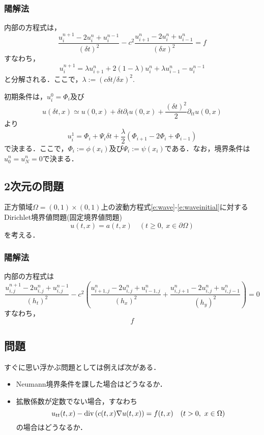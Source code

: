 \subsubsection{陽解法}
内部の方程式は，
$$
\frac{u^{n+1}_{i}-2u^{n}_{i}+u^{n-1}_{i}}{(\delta t)^{2}}-c^{2}\frac{u^{n}_{i+1}-2u^{n}_{i}+u^{n}_{i-1}}{(\delta x)^{2}}=f
$$
すなわち，
$$
u^{n+1}_{i}=\lambda u^{n}_{i+1}+2(1-\lambda)u^{n}_{i}+\lambda u^{n}_{i-1}-u^{n-1}_{i}
$$
と分解される．ここで，$\lambda:=(c\delta t/\delta x)^{2}$.

初期条件は，$u^{0}_{i}=\Phi_{i}$及び
$$
u(\delta t,x)\simeq u(0,x)+\delta t\partial_{t}u(0,x)+\frac{(\delta t)^{2}}{2}\partial_{tt}u(0,x)
$$
より
$$
u^{1}_{i}=\Phi_{i}+\Psi_{i}\delta t+\frac{\lambda}{2}(\Phi_{i+1}-2\Phi_{i}+\Phi_{i-1})
$$
で決まる．ここで，$\Phi_{i}:=\phi(x_i)$及び$\Psi_{i}:=\psi(x_i)$である．なお，境界条件は$u^{n}_{0}=u^{n}_{N}=0$で決まる．

\subsection{2次元の問題}
正方領域$\Omega=(0,1)\times(0,1)$上の波動方程式\eqref{e:wave}-\eqref{e:waveinitial}に対するDirichlet境界値問題(固定境界値問題)
\begin{equation}
\label{e:wavedirichlet}
u(t,x)=a(t,x)\quad(t\ge0,\ x\in\partial\Omega)
\end{equation}
を考える．


\subsubsection{陽解法}


内部の方程式は
$$
\frac{u^{n+1}_{i,j}-2u^{n}_{i,j}+u^{n-1}_{i,j}}{(h_{t})^{2}}-c^{2}\left(\frac{u^{n}_{i+1,j}-2u^{n}_{i,j}+u^{n}_{i-1,j}}{(h_x)^{2}}+\frac{u^{n}_{i,j+1}-2u^{n}_{i,j}+u^{n}_{i,j-1}}{(h_y)^{2}}\right)=0
$$
すなわち，
$$
f
$$

\subsection{問題}
すぐに思い浮かぶ問題としては例えば次がある．
\begin{itemize}
\item Neumann境界条件を課した場合はどうなるか．
\item 拡散係数が定数でない場合，すなわち
$$
u_{tt}(t,x)-\operatorname{\mathrm{div}\,}(c(t,x)\nabla u(t,x))=f(t,x)\quad(t>0,\ x\in\Omega)
$$
の場合はどうなるか．
\end{itemize}


